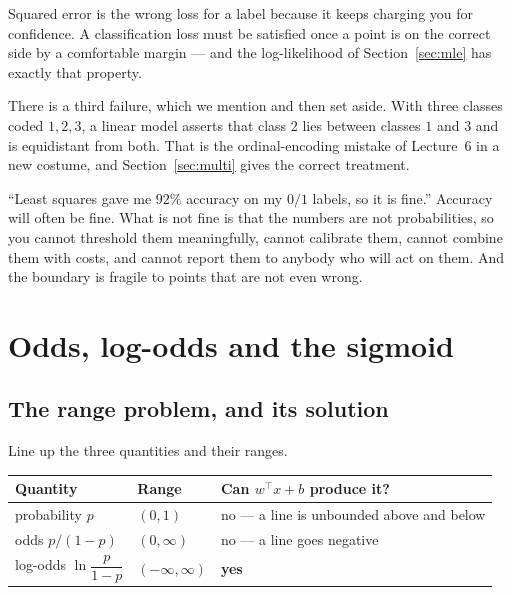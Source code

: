 \documentclass[11pt]{article}
\begin{document}
\begin{keyidea}
Squared error is the wrong loss for a label because it keeps charging you for
confidence. A classification loss must be satisfied once a point is on the
correct side by a comfortable margin --- and the log-likelihood of
Section~\ref{sec:mle} has exactly that property.
\end{keyidea}

There is a third failure, which we mention and then set aside. With three
classes coded $1, 2, 3$, a linear model asserts that class $2$ lies between
classes $1$ and $3$ and is equidistant from both. That is the ordinal-encoding
mistake of Lecture~6 in a new costume, and Section~\ref{sec:multi} gives the
correct treatment.

\begin{caution}
``Least squares gave me $92\%$ accuracy on my $0/1$ labels, so it is fine.''
Accuracy will often be fine. What is not fine is that the numbers are not
probabilities, so you cannot threshold them meaningfully, cannot calibrate
them, cannot combine them with costs, and cannot report them to anybody who
will act on them. And the boundary is fragile to points that are not even
wrong.
\end{caution}

\section{Odds, log-odds and the sigmoid}
\label{sec:logit}

\subsection{The range problem, and its solution}

Line up the three quantities and their ranges.

\begin{center}
\begin{tabular}{@{}lll@{}}
\toprule
\textbf{Quantity} & \textbf{Range} & \textbf{Can $w^{\!\top}x + b$ produce it?}\\
\midrule
probability $p$ & $(0,1)$ & no --- a line is unbounded above and below\\
odds $p/(1-p)$ & $(0,\infty)$ & no --- a line goes negative\\
log-odds $\ln\dfrac{p}{1-p}$ & $(-\infty,\infty)$ & \textbf{yes}\\
\bottomrule
\end{tabular}
\end{center}
\end{document}
